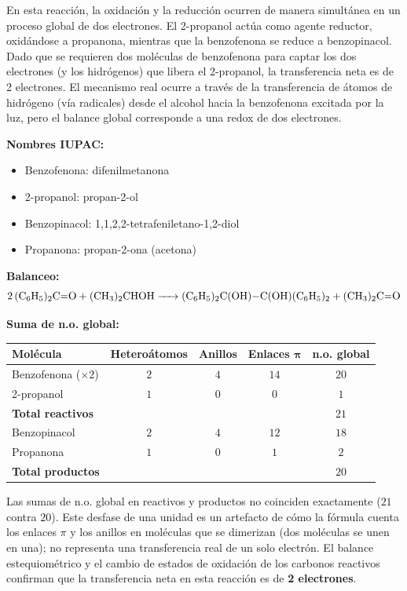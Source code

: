 En esta reacción, la oxidación y la reducción ocurren de manera simultánea 
en un proceso global de dos electrones. El 2-propanol actúa como agente 
reductor, oxidándose a propanona, mientras que la benzofenona se reduce a 
benzopinacol. Dado que se requieren dos moléculas de benzofenona para 
captar los dos electrones (y los hidrógenos) que libera el 2-propanol, 
la transferencia neta es de 2 electrones. El mecanismo real ocurre a 
través de la transferencia de átomos de hidrógeno (vía radicales) desde 
el alcohol hacia la benzofenona excitada por la luz, pero el balance 
global corresponde a una redox de dos electrones.

\textbf{Nombres IUPAC:}
\begin{itemize}
    \item Benzofenona: difenilmetanona
    \item 2-propanol: propan-2-ol
    \item Benzopinacol: 1,1,2,2-tetrafeniletano-1,2-diol
    \item Propanona: propan-2-ona (acetona)
\end{itemize}

\textbf{Balanceo:}
\[
\ce{2 (C6H5)2C=O + (CH3)2CHOH -> (C6H5)2C(OH)-C(OH)(C6H5)2 + (CH3)2C=O}
\]

\textbf{Suma de n.o. global:}
\begin{center}
\renewcommand{\arraystretch}{1.4}
\begin{tabular}{lcccc}
\hline
\textbf{Molécula} & \textbf{Heteroátomos} & \textbf{Anillos} & \textbf{Enlaces }$\boldsymbol{\pi}$ & \textbf{n.o. global} \\
\hline
Benzofenona ($\times 2$) & $2$ & $4$ & $14$ & $20$ \\
2-propanol & $1$ & $0$ & $0$ & $1$ \\
\hline
\textbf{Total reactivos} & & & & $21$ \\
\hline
Benzopinacol & $2$ & $4$ & $12$ & $18$ \\
Propanona & $1$ & $0$ & $1$ & $2$ \\
\hline
\textbf{Total productos} & & & & $20$ \\
\hline
\end{tabular}
\end{center}

Las sumas de n.o. global en reactivos y productos no coinciden exactamente 
($21$ contra $20$). Este desfase de una unidad es un artefacto de cómo 
la fórmula cuenta los enlaces \(\pi\) y los anillos en moléculas que se 
dimerizan (dos moléculas se unen en una); no representa una transferencia 
real de un solo electrón. El balance estequiométrico y el cambio de estados 
de oxidación de los carbonos reactivos confirman que la transferencia neta 
en esta reacción es de \textbf{2 electrones}.

